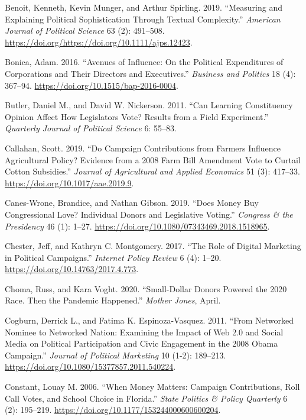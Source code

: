 \documentclass[12pt,]{article}
\begin{document}
\leavevmode\hypertarget{ref-benoit2019}{}%
Benoit, Kenneth, Kevin Munger, and Arthur Spirling. 2019. ``Measuring
and Explaining Political Sophistication Through Textual Complexity.''
\emph{American Journal of Political Science} 63 (2): 491--508.
\url{https://doi.org/https://doi.org/10.1111/ajps.12423}.

\leavevmode\hypertarget{ref-bonica2016}{}%
Bonica, Adam. 2016. ``Avenues of Influence: On the Political
Expenditures of Corporations and Their Directors and Executives.''
\emph{Business and Politics} 18 (4): 367--94.
\url{https://doi.org/10.1515/bap-2016-0004}.

\leavevmode\hypertarget{ref-butler2011}{}%
Butler, Daniel M., and David W. Nickerson. 2011. ``Can Learning
Constituency Opinion Affect How Legislators Vote? Results from a Field
Experiment.'' \emph{Quarterly Journal of Political Science} 6: 55--83.

\leavevmode\hypertarget{ref-callahan2019}{}%
Callahan, Scott. 2019. ``Do Campaign Contributions from Farmers
Influence Agricultural Policy? Evidence from a 2008 Farm Bill Amendment
Vote to Curtail Cotton Subsidies.'' \emph{Journal of Agricultural and
Applied Economics} 51 (3): 417--33.
\url{https://doi.org/10.1017/aae.2019.9}.

\leavevmode\hypertarget{ref-caneswrone2019}{}%
Canes-Wrone, Brandice, and Nathan Gibson. 2019. ``Does Money Buy
Congressional Love? Individual Donors and Legislative Voting.''
\emph{Congress \& the Presidency} 46 (1): 1--27.
\url{https://doi.org/10.1080/07343469.2018.1518965}.

\leavevmode\hypertarget{ref-chester2017}{}%
Chester, Jeff, and Kathryn C. Montgomery. 2017. ``The Role of Digital
Marketing in Political Campaigns.'' \emph{Internet Policy Review} 6 (4):
1--20. \url{https://doi.org/10.14763/2017.4.773}.

\leavevmode\hypertarget{ref-choma2020}{}%
Choma, Russ, and Kara Voght. 2020. ``Small-Dollar Donors Powered the
2020 Race. Then the Pandemic Happened.'' \emph{Mother Jones}, April.

\leavevmode\hypertarget{ref-cogburn2011}{}%
Cogburn, Derrick L., and Fatima K. Espinoza-Vasquez. 2011. ``From
Networked Nominee to Networked Nation: Examining the Impact of Web 2.0
and Social Media on Political Participation and Civic Engagement in the
2008 Obama Campaign.'' \emph{Journal of Political Marketing} 10 (1-2):
189--213. \url{https://doi.org/10.1080/15377857.2011.540224}.

\leavevmode\hypertarget{ref-constant2006}{}%
Constant, Louay M. 2006. ``When Money Matters: Campaign Contributions,
Roll Call Votes, and School Choice in Florida.'' \emph{State Politics \&
Policy Quarterly} 6 (2): 195--219.
\url{https://doi.org/10.1177/153244000600600204}.
\end{document}

